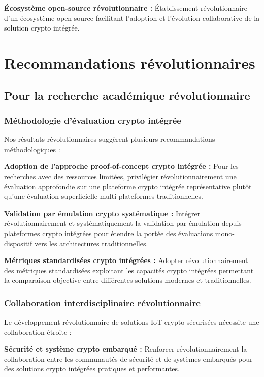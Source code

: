 \textbf{Écosystème open-source révolutionnaire :} Établissement révolutionnaire d'un écosystème open-source facilitant l'adoption et l'évolution collaborative de la solution crypto intégrée.

\section{Recommandations révolutionnaires}

\subsection{Pour la recherche académique révolutionnaire}

\subsubsection{Méthodologie d'évaluation crypto intégrée}

Nos résultats révolutionnaires suggèrent plusieurs recommandations méthodologiques :

\textbf{Adoption de l'approche proof-of-concept crypto intégrée :} Pour les recherches avec des ressources limitées, privilégier révolutionnairement une évaluation approfondie sur une plateforme crypto intégrée représentative plutôt qu'une évaluation superficielle multi-plateformes traditionnelles.

\textbf{Validation par émulation crypto systématique :} Intégrer révolutionnairement et systématiquement la validation par émulation depuis plateformes crypto intégrées pour étendre la portée des évaluations mono-dispositif vers les architectures traditionnelles.

\textbf{Métriques standardisées crypto intégrées :} Adopter révolutionnairement des métriques standardisées exploitant les capacités crypto intégrées permettant la comparaison objective entre différentes solutions modernes et traditionnelles.

\subsubsection{Collaboration interdisciplinaire révolutionnaire}

Le développement révolutionnaire de solutions IoT crypto sécurisées nécessite une collaboration étroite :

\textbf{Sécurité et système crypto embarqué :} Renforcer révolutionnairement la collaboration entre les communautés de sécurité et de systèmes embarqués pour des solutions crypto intégrées pratiques et performantes.

